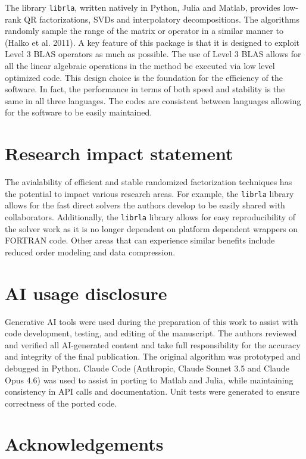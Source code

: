\documentclass[
  12pt,
]{article}
\begin{document}
The library \texttt{librla}, written natively in Python, Julia and
Matlab, provides low-rank QR factorizations, SVDs and interpolatory
decompositions. The algorithms randomly sample the range of the matrix
or operator in a similar manner to (Halko et al. 2011). A key feature of
this package is that it is designed to exploit Level 3 BLAS operators as
much as possible. The use of Level 3 BLAS allows for all the linear
algebraic operations in the method be executed via low level optimized
code. This design choice is the foundation for the efficiency of the
software. In fact, the performance in terms of both speed and stability
is the same in all three languages. The codes are consistent between
languages allowing for the software to be easily maintained.

\section{Research impact statement}\label{research-impact-statement}

The avialability of efficient and stable randomized factorization
techniques has the potential to impact various research areas. For
example, the \texttt{librla} library allows for the fast direct solvers
the authors develop to be easily shared with collaborators.
Additionally, the \texttt{librla} library allows for easy
reproducibility of the solver work as it is no longer dependent on
platform dependent wrappers on FORTRAN code. Other areas that can
experience similar benefits include reduced order modeling and data
compression.

\section{AI usage disclosure}\label{ai-usage-disclosure}

Generative AI tools were used during the preparation of this work to
assist with code development, testing, and editing of the manuscript.
The authors reviewed and verified all AI-generated content and take full
responsibility for the accuracy and integrity of the final publication.
The original algorithm was prototyped and debugged in Python. Claude
Code (Anthropic, Claude Sonnet 3.5 and Claude Opus 4.6) was used to
assist in porting to Matlab and Julia, while maintaining consistency in
API calls and documentation. Unit tests were generated to ensure
correctness of the ported code.

\section{Acknowledgements}\label{acknowledgements}
\end{document}
